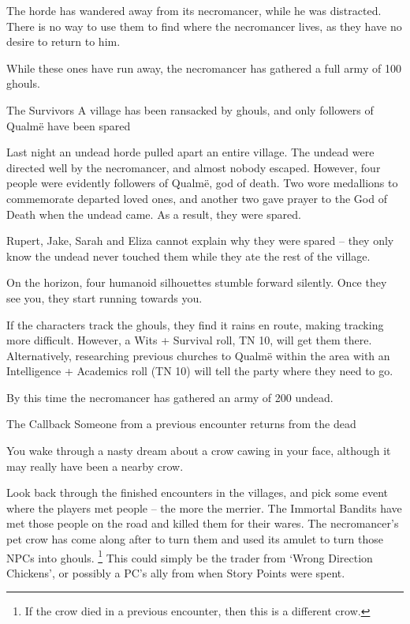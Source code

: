 \begin{multicols}{2}
The horde has wandered away from its necromancer, while he was distracted.
There is no way to use them to find where the necromancer lives, as they have no desire to return to him.

While these ones have run away, the necromancer has gathered a full army of 100 ghouls.

{The Survivors}%
{A village has been ransacked by ghouls, and only followers of Qualm\"{e} have been spared}%

Last night an undead horde pulled apart an entire village.  The undead were directed well by the necromancer, and almost nobody escaped.
However, four people were evidently followers of Qualm\"{e}, god of death.
Two wore medallions to commemorate departed loved ones, and another two gave prayer to the God of Death when the undead came.
As a result, they were spared.

Rupert, Jake, Sarah and Eliza cannot explain why they were spared -- they only know the undead never touched them while they ate the rest of the village.

\begin{boxtext}

	On the horizon, four humanoid silhouettes stumble forward silently.  Once they see you, they start running towards you.

\end{boxtext}

If the characters track the ghouls, they find it rains en route, making tracking more difficult.
However, a Wits + Survival roll, TN 10, will get them there.
Alternatively, researching previous churches to Qualm\"{e} within the area with an Intelligence + Academics roll (TN 10) will tell the party where they need to go.

By this time the necromancer has gathered an army of 200 undead.

{The Callback}%
{Someone from a previous encounter returns from the dead}%

\begin{boxtext}

	You wake through a nasty dream about a crow cawing in your face, although it may really have been a nearby crow.

\end{boxtext}

Look back through the finished encounters in the villages, and pick some event where the players met people -- the more the merrier.
The Immortal Bandits have met those people on the road and killed them for their wares.
The necromancer's pet crow has come along after to turn them and used its amulet to turn those NPCs into ghouls.
\footnote{If the crow died in a previous encounter, then this is a different crow.}
This could simply be the trader from `Wrong Direction Chickens', or possibly a PC's ally from when Story Points were spent.


\end{multicols}
